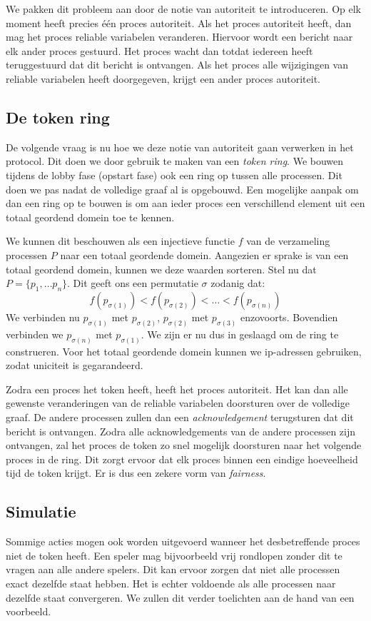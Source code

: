 \documentclass[a4paper,11pt, twoside]{article}
\begin{document}
    We pakken dit probleem aan door de notie van autoriteit te introduceren. Op elk moment heeft precies \'e\'en proces autoriteit. Als het proces autoriteit heeft, dan mag het proces reliable variabelen veranderen. Hiervoor wordt een bericht naar elk ander proces gestuurd. Het proces wacht dan totdat iedereen heeft teruggestuurd dat dit bericht is ontvangen. Als het proces alle wijzigingen van reliable variabelen heeft doorgegeven, krijgt een ander proces autoriteit.

    \subsection{De token ring}
    De volgende vraag is nu hoe we deze notie van autoriteit gaan verwerken in het protocol. Dit doen we door gebruik te maken van een \emph{token ring}. We bouwen tijdens de lobby fase (opstart fase) ook een ring op tussen alle processen. Dit doen we pas nadat de volledige graaf al is opgebouwd. Een mogelijke aanpak om dan een ring op te bouwen is om aan ieder proces een verschillend element uit een totaal geordend domein toe te kennen.

    We kunnen dit beschouwen als een injectieve functie $f$ van de verzameling processen $P$ naar een totaal geordende domein. Aangezien er sprake is van een totaal geordend domein, kunnen we deze waarden sorteren. Stel nu dat $P = \{ p_1, \ldots p_n\}$. Dit geeft ons een permutatie $\sigma$ zodanig dat:
    \[
    f(p_{\sigma(1)}) < f(p_{\sigma(2)}) < \ldots < f(p_{\sigma(n)})
    \]
    We verbinden nu $p_{\sigma(1)}$ met $p_{\sigma(2)}$, $p_{\sigma(2)}$ met $p_{\sigma(3)}$ enzovoorts. Bovendien verbinden we $p_{\sigma(n)}$ met $p_{\sigma(1)}$. We zijn er nu dus in geslaagd om de ring te construeren. Voor het totaal geordende domein kunnen we ip-adressen gebruiken, zodat uniciteit is gegarandeerd.

    Zodra een proces het token heeft, heeft het proces autoriteit. Het kan dan alle gewenste veranderingen van de reliable variabelen doorsturen over de volledige graaf. De andere processen zullen dan een \emph{acknowledgement} terugsturen dat dit bericht is ontvangen. Zodra alle acknowledgements van de andere processen zijn ontvangen, zal het proces de token zo snel mogelijk doorsturen naar het volgende proces in de ring. Dit zorgt ervoor dat elk proces binnen een eindige hoeveelheid tijd de token krijgt. Er is dus een zekere vorm van \emph{fairness}.

    \subsection{Simulatie}
    Sommige acties mogen ook worden uitgevoerd wanneer het desbetreffende proces niet de token heeft. Een speler mag bijvoorbeeld vrij rondlopen zonder dit te vragen aan alle andere spelers. Dit kan ervoor zorgen dat niet alle processen exact dezelfde staat hebben. Het is echter voldoende als alle processen naar dezelfde staat convergeren. We zullen dit verder toelichten aan de hand van een voorbeeld.
\end{document}
